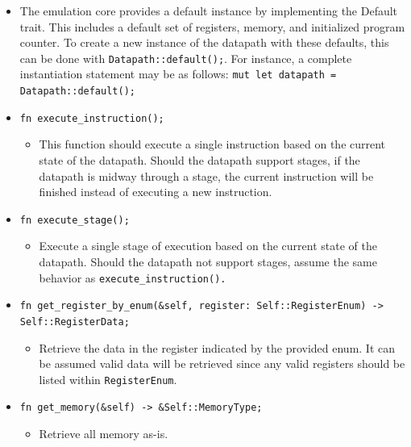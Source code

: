 \documentclass[
    parskip=half,
    fontsize=12pt,
    titlepage=firstiscover,
    toc=bibliography,
    numbers=endperiod
]{scrartcl}
\providecommand{\tightlist}{%
  \setlength{\itemsep}{0pt}\setlength{\parskip}{0pt}}
\begin{document}
\begin{itemize}
\begin{itemize}
        \item The emulation core provides a default instance by implementing the
            Default trait. This includes a default set of registers, memory, and
            initialized program counter. To create a new instance of the
            datapath with these defaults, this can be done with
            \texttt{Datapath::default();}. For instance, a complete instantiation
            statement may be as follows: \texttt{mut let datapath = Datapath::default();}
        \item \texttt{fn execute\_instruction();}
        \begin{itemize}
            \tightlist
            \item This function should execute a single instruction based on the
            current state of the datapath. Should the datapath support stages,
            if the datapath is midway through a stage, the current instruction
            will be finished instead of executing a new instruction.
        \end{itemize}
        \item \texttt{fn execute\_stage();}
        \begin{itemize}
            \tightlist
            \item Execute a single stage of execution based on the current state of
            the datapath. Should the datapath not support stages, assume the
            same behavior as \texttt{execute\_instruction().}
        \end{itemize}
        \item \texttt{fn get\_register\_by\_enum(\&self, register: Self::RegisterEnum) -\textgreater{} Self::RegisterData;}
        \begin{itemize}
            \tightlist
            \item Retrieve the data in the register indicated by the provided enum.
            It can be assumed valid data will be retrieved since any valid
            registers should be listed within \texttt{RegisterEnum}.
        \end{itemize}
        \item \texttt{fn get\_memory(\&self) -\textgreater{} \&Self::MemoryType;}
        \begin{itemize}
            \tightlist
            \item Retrieve all memory as-is.
        \end{itemize}
    \end{itemize}


\end{itemize}
\end{document}
